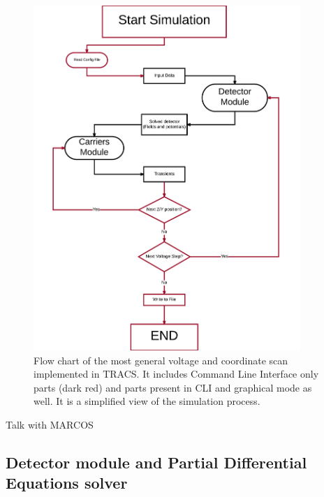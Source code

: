 \begin{figure}[H]
	\centering
	\includegraphics[width=0.9\textwidth]{TRACS_fc.png}
	\caption{Flow chart of the most general voltage and coordinate scan implemented in TRACS. It includes Command Line Interface only parts (dark red) and parts present in CLI and graphical mode as well. It is a simplified view of the simulation process.}
	\label{fig:TRACS_fc}
\end{figure}

Talk with MARCOS %

\subsection{Detector module and Partial Differential Equations solver}

